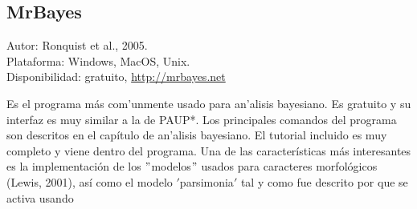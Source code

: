 \subsection{MrBayes}
\noindent
Autor: Ronquist et al., 2005.\\
Plataforma: Windows, MacOS, Unix.\\
Disponibilidad: gratuito, \url{http://mrbayes.net}

Es el programa m\'as com'unmente usado para an'alisis bayesiano. Es gratuito y su interfaz es muy similar a la de PAUP*. Los principales comandos del programa son descritos en el cap\'itulo de an'alisis bayesiano. El tutorial incluido es muy completo y viene dentro del programa. Una de las caracter\'isticas m\'as interesantes es la implementaci\'on de los $"$modelos$"$ usados para caracteres morfol\'ogicos (Lewis, 2001), as\'i como el modelo  $'$parsimonia$'$ tal y como fue descrito por \cite{tuffley1997} que se activa usando 






